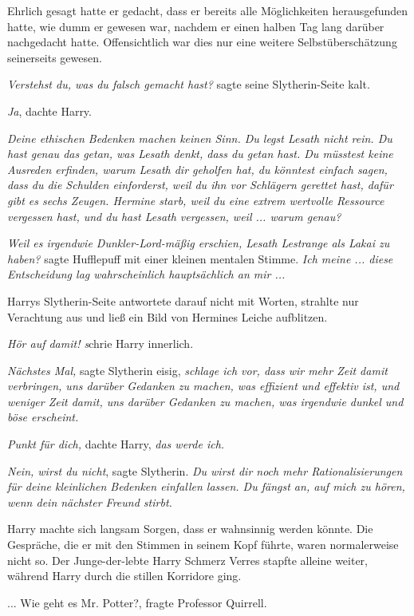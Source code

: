 Ehrlich gesagt hatte er gedacht, dass er bereits alle Möglichkeiten
herausgefunden hatte, wie dumm er gewesen war, nachdem er einen halben Tag lang
darüber nachgedacht hatte. Offensichtlich war dies nur eine weitere
Selbstüberschätzung seinerseits gewesen.

\emph{Verstehst du, was du falsch gemacht hast?} sagte seine Slytherin-Seite
kalt.

\emph{Ja}, dachte Harry.

\emph{Deine ethischen Bedenken machen keinen Sinn. Du legst Lesath nicht rein.
Du hast genau das getan, was Lesath denkt, dass du getan hast. Du müsstest keine
Ausreden erfinden, warum Lesath dir geholfen hat, du könntest einfach sagen,
dass du die Schulden einforderst, weil du ihn vor Schlägern gerettet hast, dafür
gibt es sechs Zeugen. Hermine starb, weil du eine extrem wertvolle Ressource
vergessen hast, und du hast Lesath vergessen, weil ... warum genau?}

\emph{Weil es irgendwie Dunkler-Lord-mäßig erschien, Lesath Lestrange als Lakai
zu haben?} sagte Hufflepuff mit einer kleinen mentalen Stimme.\emph{ Ich
meine ... diese Entscheidung lag wahrscheinlich hauptsächlich an mir ...}

Harrys Slytherin-Seite antwortete darauf nicht mit Worten, strahlte nur
Verachtung aus und ließ ein Bild von Hermines Leiche aufblitzen.

\emph{Hör auf damit! s}chrie Harry innerlich.

\emph{Nächstes Mal,} sagte Slytherin eisig, \emph{schlage ich vor, dass wir mehr
Zeit damit verbringen, uns darüber Gedanken zu machen, was effizient und
effektiv ist, und weniger Zeit damit, uns darüber Gedanken zu machen, was
irgendwie dunkel und böse erscheint.}

\emph{Punkt für dich,} dachte Harry, \emph{das werde ich.}

\emph{Nein, wirst du nicht}, sagte Slytherin. \emph{Du wirst dir noch mehr
Rationalisierungen für deine kleinlichen Bedenken einfallen lassen. Du fängst
an, auf mich zu hören, wenn dein nächster Freund stirbt.}

Harry machte sich langsam Sorgen, dass er wahnsinnig werden könnte. Die
Gespräche, die er mit den Stimmen in seinem Kopf führte, waren normalerweise
nicht so. Der Junge-der-lebte Harry Schmerz Verres stapfte alleine weiter,
während Harry durch die stillen Korridore ging.

... \glqq{}Wie geht es Mr. Potter?\grqq{}, fragte Professor Quirrell.

